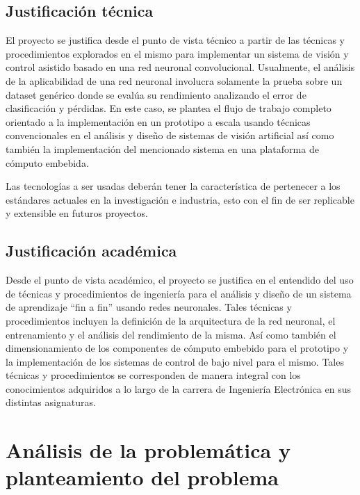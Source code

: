\documentclass[12pt,letterpaper]{article}
\begin{document}
\subsection{Justificación técnica}
El proyecto se justifica desde el punto de vista técnico a partir de las técnicas y procedimientos explorados 
en el mismo para implementar un sistema de visión y control asistido basado en una red neuronal convolucional. 
Usualmente, el análisis de la aplicabilidad de una red neuronal involucra solamente la prueba sobre un dataset 
genérico donde se evalúa su rendimiento analizando el error de clasificación y pérdidas. En este caso, se plantea el 
flujo de trabajo completo orientado a la implementación en un prototipo a escala usando técnicas convencionales en 
el análisis y diseño de sistemas de visión artificial así como también la implementación del mencionado sistema en 
una plataforma de cómputo embebida.

Las tecnologías a ser usadas deberán tener la característica de pertenecer a los estándares actuales en la 
investigación e industria, esto con el fin de ser replicable y extensible en futuros proyectos.

\subsection{Justificación académica}

Desde el punto de vista académico, el proyecto se justifica en el entendido del uso de técnicas y procedimientos 
de ingeniería para el análisis y diseño de un sistema de aprendizaje “fin a fin” usando redes neuronales. Tales 
técnicas y procedimientos incluyen la definición de la arquitectura de la red neuronal, el entrenamiento y el análisis 
del rendimiento de la misma. Así como también el dimensionamiento de los componentes de cómputo embebido para el 
prototipo y la implementación de los sistemas de control de bajo nivel para el mismo. Tales técnicas y 
procedimientos se corresponden de manera integral con los conocimientos adquiridos a lo largo de la carrera 
de Ingeniería Electrónica en sus distintas asignaturas.


\section{Análisis de la problemática y \\
planteamiento del problema}
\end{document}

